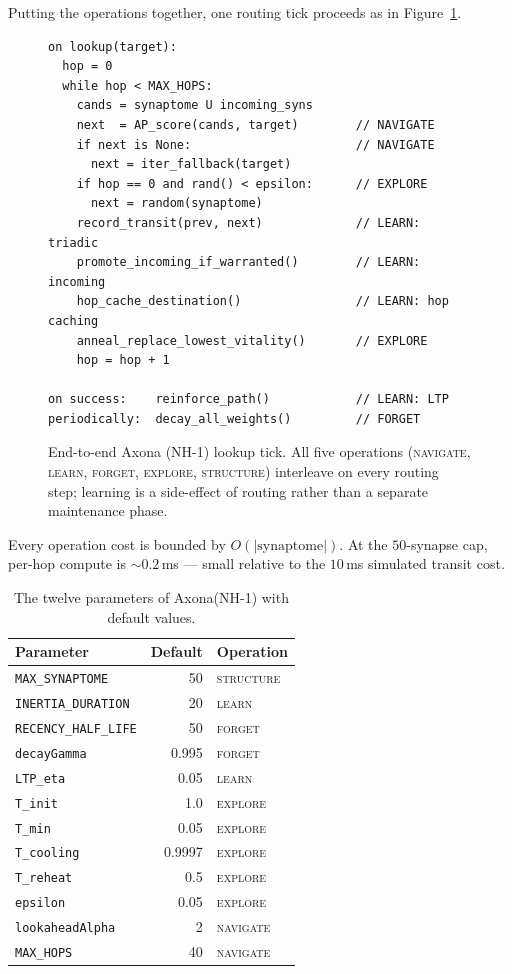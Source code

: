 \documentclass[conference]{IEEEtran}
\newcommand{\axona}{Axona\xspace}
\newcommand{\nhone}{NH-1\xspace}
\begin{document}
Putting the operations together, one routing tick proceeds as in
Figure~\ref{fig:tick}.

\begin{figure}[t]
{\footnotesize
\begin{verbatim}
on lookup(target):
  hop = 0
  while hop < MAX_HOPS:
    cands = synaptome U incoming_syns
    next  = AP_score(cands, target)        // NAVIGATE
    if next is None:                       // NAVIGATE
      next = iter_fallback(target)
    if hop == 0 and rand() < epsilon:      // EXPLORE
      next = random(synaptome)
    record_transit(prev, next)             // LEARN: triadic
    promote_incoming_if_warranted()        // LEARN: incoming
    hop_cache_destination()                // LEARN: hop caching
    anneal_replace_lowest_vitality()       // EXPLORE
    hop = hop + 1

on success:    reinforce_path()            // LEARN: LTP
periodically:  decay_all_weights()         // FORGET
\end{verbatim}}
\caption{End-to-end Axona (\nhone) lookup tick. All five operations
(\textsc{navigate}, \textsc{learn}, \textsc{forget}, \textsc{explore},
\textsc{structure}) interleave on every routing step; learning is a
side-effect of routing rather than a separate maintenance phase.}
\label{fig:tick}
\end{figure}

Every operation cost is bounded by $O(|\mathrm{synaptome}|)$. At the
$50$-synapse cap, per-hop compute is $\sim\!0.2$\,ms --- small relative
to the $10$\,ms simulated transit cost.

\begin{table}[t]
\centering
\caption{The twelve parameters of \axona (\nhone) with default values.}
\label{tab:params}
\small
\begin{tabular}{@{}lrl@{}}
\toprule
\textbf{Parameter} & \textbf{Default} & \textbf{Operation} \\
\midrule
\texttt{MAX\_SYNAPTOME} & 50 & \textsc{structure} \\
\texttt{INERTIA\_DURATION} & 20 & \textsc{learn} \\
\texttt{RECENCY\_HALF\_LIFE} & 50 & \textsc{forget} \\
\texttt{decayGamma} & 0.995 & \textsc{forget} \\
\texttt{LTP\_eta} & 0.05 & \textsc{learn} \\
\texttt{T\_init} & 1.0 & \textsc{explore} \\
\texttt{T\_min} & 0.05 & \textsc{explore} \\
\texttt{T\_cooling} & 0.9997 & \textsc{explore} \\
\texttt{T\_reheat} & 0.5 & \textsc{explore} \\
\texttt{epsilon} & 0.05 & \textsc{explore} \\
\texttt{lookaheadAlpha} & 2 & \textsc{navigate} \\
\texttt{MAX\_HOPS} & 40 & \textsc{navigate} \\
\bottomrule
\end{tabular}
\end{table}
\end{document}
